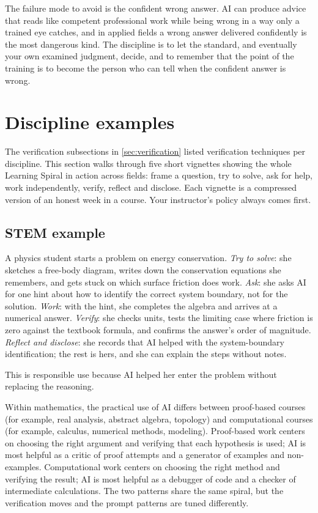 \documentclass{SIAMbook2023}
\begin{document}
The failure mode to avoid is the confident wrong answer. AI can produce advice that reads like competent professional work while being wrong in a way only a trained eye catches, and in applied fields a wrong answer delivered confidently is the most dangerous kind. The discipline is to let the standard, and eventually your own examined judgment, decide, and to remember that the point of the training is to become the person who can tell when the confident answer is wrong.

\section{Discipline examples}
\label{sec:discipline-examples}

The verification subsections in \cref{sec:verification} listed verification techniques per discipline. This section walks through five short vignettes showing the whole Learning Spiral in action across fields: frame a question, try to solve, ask for help, work independently, verify, reflect and disclose. Each vignette is a compressed version of an honest week in a course. Your instructor's policy always comes first.

\subsection{STEM example}
\label{subsec:stem-example}

A physics student starts a problem on energy conservation. \emph{Try to solve}: she sketches a free-body diagram, writes down the conservation equations she remembers, and gets stuck on which surface friction does work. \emph{Ask}: she asks AI for one hint about how to identify the correct system boundary, not for the solution. \emph{Work}: with the hint, she completes the algebra and arrives at a numerical answer. \emph{Verify}: she checks units, tests the limiting case where friction is zero against the textbook formula, and confirms the answer's order of magnitude. \emph{Reflect and disclose}: she records that AI helped with the system-boundary identification; the rest is hers, and she can explain the steps without notes.

This is responsible use because AI helped her enter the problem without replacing the reasoning.

Within mathematics, the practical use of AI differs between proof-based courses (for example, real analysis, abstract algebra, topology) and computational courses (for example, calculus, numerical methods, modeling). Proof-based work centers on choosing the right argument and verifying that each hypothesis is used; AI is most helpful as a critic of proof attempts and a generator of examples and non-examples. Computational work centers on choosing the right method and verifying the result; AI is most helpful as a debugger of code and a checker of intermediate calculations. The two patterns share the same spiral, but the verification moves and the prompt patterns are tuned differently.
\end{document}
